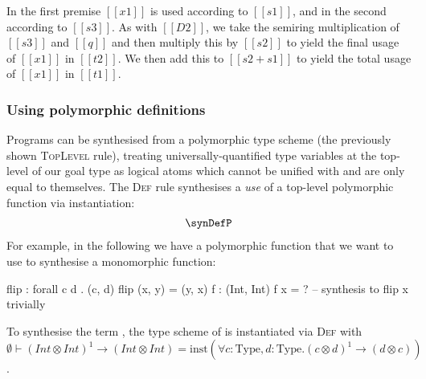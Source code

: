 In the first premise $[[ x1 ]]$ is used according to $[[ s1 ]]$, and in the
second according to $[[ s3 ]]$. As with $[[ D2 ]]$, we take the semiring
multiplication of $[[ s3 ]]$ and $[[ q ]]$ and then multiply this by $[[ s2 ]]$
to yield the final usage of $[[ x1 ]]$ in $[[ t2 ]]$. We then add this to $[[ s2
+ s1 ]]$ to yield the total usage of $[[ x1 ]]$ in $[[ t1 ]]$.









\subsubsection{Using polymorphic definitions}

Programs can be synthesised from a polymorphic type scheme (the
previously shown \textsc{TopLevel} rule), treating
universally-quantified type variables at the top-level of our goal type
as logical atoms which cannot be unified with and are only equal to
themselves. The \textsc{Def} rule synthesises a \emph{use}
of a top-level polymorphic function via instantiation:
\begin{align*}
  \synDefP
\end{align*}
%
For example, in the following we have a polymorphic
function  that we want to use to synthesise a monomorphic function:
%
\begin{granule}
flip : forall c d  . (c, d) %
flip (x, y) = (y, x)
f : (Int, Int) %
f x = ? -- synthesis to flip x trivially
\end{granule}
%
To synthesise the term , the type scheme of  is
instantiated via \textsc{Def} with
$\emptyset \vdash (\mathit{Int} \otimes \mathit{Int})^1 \rightarrow (\mathit{Int} \otimes \mathit{Int})
= \text{inst}(\forall c : \text{Type}, d : \text{Type} . (c \otimes d)^1 \rightarrow (d \otimes c))$.


